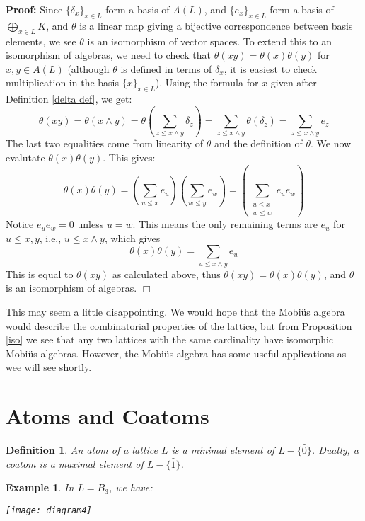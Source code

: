\documentclass[11pt]{article}
\newtheorem{definition}[theorem]{Definition}
\newtheorem{example}[theorem]{Example}
\newenvironment{proof}{\noindent \textbf{Proof:}}{$\Box$}
\begin{document}
\begin{proof}
Since $\{\delta_x\}_{x\in L}$ form a basis of $A(L)$, and $\{e_x\}_{x\in L}$ form a basis of $\bigoplus_{x\in L} K$, and $\theta$ is a linear map giving a bijective correspondence between basis elements, we see $\theta$ is an isomorphism of vector spaces. To extend this to an isomorphism of algebras, we need to check that $\theta(xy)=\theta(x)\theta(y)$ for $x,y\in A(L)$ (although $\theta$ is defined in terms of $\delta_x$, it is easiest to check multiplication in the basis $\{x\}_{x\in L}$). Using the formula for $x$ given after Definition \ref{delta def}, we get:
$$\theta(xy)=\theta(x\wedge y)=\theta\left(\sum_{z\le x\wedge y} \delta_z \right)=\sum_{z\le x\wedge y} \theta(\delta_z)=\sum_{z\le x\wedge y} e_z$$
The last two equalities come from linearity of $\theta$ and the definition of $\theta$.
We now evalutate $\theta(x)\theta(y)$. This gives:
$$\theta(x)\theta(y)=\left(\sum_{u\le x} e_u\right)\left(\sum_{w\le y} e_w\right)=\left(\sum_{\substack{u\le x\\ w\le w}} e_ue_w\right)$$
Notice $e_ue_w=0$ unless $u=w$. This means the only remaining terms are $e_u$ for $u\le x,y$, i.e., $u\le x\wedge y$, which gives
$$\theta(x)\theta(y)=\sum_{u\le x \wedge y} e_u$$
This is equal to $\theta(xy)$ as calculated above, thus $\theta(xy)=\theta(x)\theta(y)$, and $\theta$ is an isomorphism of algebras. 
\end{proof}




This may seem a little disappointing. We would hope that the Mobi\"us algebra would describe the combinatorial properties of the lattice, but from Proposition \ref{iso} we see that any two lattices with the same cardinality have isomorphic Mobi\"us algebras.  However, the Mobi\"us algebra has some useful applications as wee will see shortly.

\section{Atoms and Coatoms}

\begin{definition}
An \emph{atom} of a lattice $L$ is a minimal element of $L-\{\hat{0}\}$. Dually, a \emph{coatom} is a maximal element of $L-\{\hat{1}\}$. 
\end{definition}

\begin{example}
In $L=B_3$, we have:

\begin{center}
\texttt{[image: diagram4]}
\end{center}
\end{example}
\end{document}
